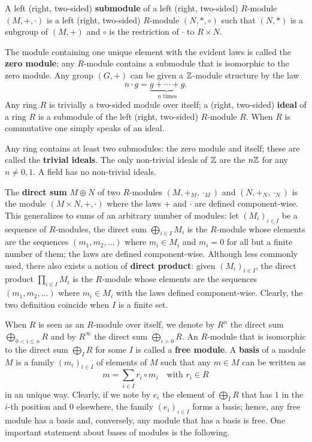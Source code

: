 A left
(right,
two-sided) \textbf{submodule} of a left
(right, two-sided) $R$-module $(M,+,\cdot)$ is a left (right, two-sided)
$R$-module $(N,\ast,\circ)$ such that $(N,\ast)$ is a subgroup of
$(M,+)$ and $\circ$ is the restriction of $\cdot$ to $R\times N$.

The module containing one unique element with the evident laws is
called the \textbf{zero module}; any
$R$-module contains a submodule that is isomorphic to the zero
module. Any group $(G,+)$ can be given a $\mathbb{Z}$-module structure by the
law
\[n\cdot g = \underbrace{g + \cdots + g}_{n\text{ times}} \text{.}\]
Any ring $R$ is trivially a two-sided module over itself; a
 (right,
two-sided) \textbf{ideal} of a ring $R$ is a
submodule of the left (right, two-sided) $R$-module $R$.  When $R$ is
commutative one simply speaks of an ideal.  

Any ring contains at least two submodules: the zero module and itself;
these are called the \textbf{trivial ideals}. The
only non-trivial ideals of $\mathbb{Z}$ are the $n\mathbb{Z}$ for any $n\ne0,1$. A
field has no non-trivial ideals.

The \textbf{direct sum} $M\oplus N$ of two
$R$-modules $(M,+_M,\cdot_M)$ and $(N,+_N,\cdot_N)$ is the module
$(M\times N,+,\cdot)$ where the laws $+$ and $\cdot$ are defined
component-wise. This generalizes to sums of an arbitrary number of
modules: let $(M_i)_{i\in I}$ be a sequence of $R$-modules, the direct
sum $\bigoplus_{i\in I}M_i$ is the $R$-module whose elements are the
sequences $(m_1,m_2,\ldots)$ where $m_i\in M_i$ and $m_i=0$ for all
but a finite number of them; the laws are defined component-wise.
Although less commonly used, there also exists a notion of
\textbf{direct product}: given $(M_i)_{i\in I}$,
the direct product $\prod_{i\in I}M_i$ is the $R$-module whose
elements are the sequences $(m_1,m_2,\ldots)$ where $m_i\in M_i$ with
the laws defined component-wise. Clearly, the two definition coincide
when $I$ is a finite set.

When $R$ is seen as an $R$-module over itself, we denote by $R^n$ the
direct sum $\bigoplus_{0<i\le n}R$ and by $R^\infty$ the direct sum
$\bigoplus_{i>0}R$. An $R$-module that is isomorphic to the direct sum
$\bigoplus_{I}R$ for some $I$ is called a
\textbf{free module}. A \textbf{basis}
of a module $M$ is a family $(m_i)_{i\in I}$ of elements of $M$ such
that any $m\in M$ can be written as 
\begin{equation}
  \label{eq:module-basis}
  m = \sum_{i\in I} r_i\circ m_i
  \quad\text{with $r_i\in R$}
\end{equation}
in an unique way. Clearly, if we note by $e_i$ the element of
$\bigoplus_IR$ that has $1$ in the $i$-th position and $0$ elsewhere,
the family $(e_i)_{i\in I}$ forms a basis; hence, any free module has
a basis and, conversely, any module that has a basis is free. One
important statement about bases of modules is the following.

